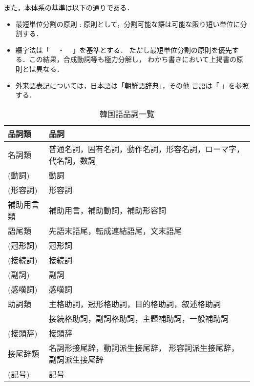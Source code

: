 また，本体系の基準は以下の通りである．

\begin{itemize}
\item 
最短単位分割の原則 : 
原則として，分割可能な語は可能な限り短い単位に分割する．
\item 
綴字法は「
\ 
・
\ 
」\cite{ハングル綴字法}を基準とする．
ただし最短単位分割の原則を優先する．この結果，合成動詞等も極力分解し，
わかち書きにおいて上掲書の原則とは異なる．
\item 
外来語表記については，日本語は「朝鮮語辞典」\cite{朝鮮語辞典}，その他
言語は「
」\cite{国語大辞典}を参照する．
\end{itemize}



\begin{table}
\begin{center}
\caption{韓国語品詞一覧}
\label{表:品詞一覧}
\begin{tabular}{l|l}
\hline\hline
品詞類 & 品詞\\
\hline
名詞類 & 普通名詞，固有名詞，動作名詞，形容名詞，ローマ字，
         代名詞，数詞\\
\hline
(動詞)     & 動詞\\
\hline
(形容詞)   & 形容詞\\
\hline
補助用言類 & 補助用言，補助動詞，補助形容詞\\
\hline
語尾類     & 先語末語尾，転成連結語尾，文末語尾\\
\hline
(冠形詞)   & 冠形詞\\
\hline
(接続詞)   & 接続詞\\
\hline
(副詞)     & 副詞\\
\hline
(感嘆詞)   & 感嘆詞\\
\hline
助詞類     & 主格助詞，冠形格助詞，目的格助詞，叙述格助詞\\
           & 接続格助詞，副詞格助詞，主題補助詞，一般補助詞\\
\hline
(接頭辞)   & 接頭辞\\
\hline
接尾辞類   & 名詞形接尾辞，動詞派生接尾辞，
             形容詞派生接尾辞，副詞派生接尾辞\\
\hline
(記号)     & 記号\\
\hline
\end{tabular}
\end{center}
\end{table}


